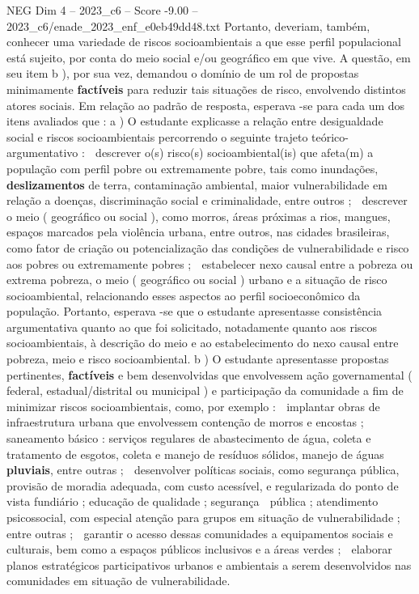 \begin{textsample}{NEG Dim 4 – 2023\_c6 – Score -9.00 – 2023\_c6/enade\_2023\_enf\_e0eb49dd48.txt}
Portanto, deveriam, também, conhecer uma variedade de riscos socioambientais a que esse perfil populacional está sujeito, por conta do meio social e/ou geográfico em que vive.
A questão, em seu item b ), por sua vez, demandou o domínio de um rol de propostas minimamente \textbf{factíveis} para reduzir tais situações de risco, envolvendo distintos atores sociais.
Em relação ao padrão de resposta, esperava -se para cada um dos itens avaliados que : a ) O estudante explicasse a relação entre desigualdade social e riscos socioambientais percorrendo o seguinte trajeto teórico-argumentativo :  descrever o(s) risco(s) socioambiental(is) que afeta(m) a população com perfil pobre ou extremamente pobre, tais como inundações, \textbf{deslizamentos} de terra, contaminação ambiental, maior vulnerabilidade em relação a doenças, discriminação social e criminalidade, entre outros ;  descrever o meio ( geográfico ou social ), como morros, áreas próximas a rios, mangues, espaços marcados pela violência urbana, entre outros, nas cidades brasileiras, como fator de criação ou potencialização das condições de vulnerabilidade e risco aos pobres ou extremamente pobres ;  estabelecer nexo causal entre a pobreza ou extrema pobreza, o meio ( geográfico ou social ) urbano e a situação de risco socioambiental, relacionando esses aspectos ao perfil socioeconômico da população.
Portanto, esperava -se que o estudante apresentasse consistência argumentativa quanto ao que foi solicitado, notadamente quanto aos riscos socioambientais, à descrição do meio e ao estabelecimento do nexo causal entre pobreza, meio e risco socioambiental. b ) O estudante apresentasse propostas pertinentes, \textbf{factíveis} e bem desenvolvidas que envolvessem ação governamental ( federal, estadual/distrital ou municipal ) e participação da comunidade a fim de minimizar riscos socioambientais, como, por exemplo :  implantar obras de infraestrutura urbana que envolvessem contenção de morros e encostas ; saneamento básico : serviços regulares de abastecimento de água, coleta e tratamento de esgotos, coleta e manejo de resíduos sólidos, manejo de águas \textbf{pluviais}, entre outras ;  desenvolver políticas sociais, como segurança pública, provisão de moradia adequada, com custo acessível, e regularizada do ponto de vista fundiário ; educação de qualidade ; segurança  pública ; atendimento psicossocial, com especial atenção para grupos em situação de vulnerabilidade ; entre outras ;  garantir o acesso dessas comunidades a equipamentos sociais e culturais, bem como a espaços públicos inclusivos e a áreas verdes ;  elaborar planos estratégicos participativos urbanos e ambientais a serem desenvolvidos nas comunidades em situação de vulnerabilidade.

\end{textsample}
